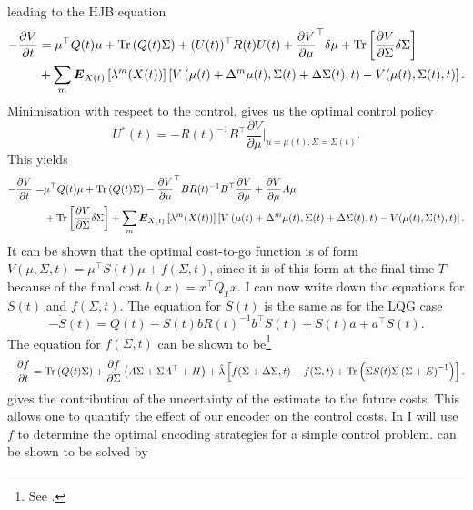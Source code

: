 leading to the HJB equation
\begin{eqnarray}
-\frac{\partial V}{\partial t} &=\mu^\top Q(t)\mu + \operatorname{Tr}\left(Q(t) \Sigma\right) +(U(t))^\top R(t) U(t)  + \frac{\partial V}{\partial \mu}^\top \delta\mu +\operatorname{Tr}\left[\frac{\partial V}{\partial \Sigma} \delta \Sigma\right] \\
&+\sum_m \boldsymbol{E}_{X(t)}\left[\lambda^m(X(t))\right]\left[V\left(\mu(t) +\Delta^m\mu(t) , \Sigma(t)+\Delta\Sigma(t),t\right)-V(\mu(t),\Sigma(t),t)\right]\nonumber.
\end{eqnarray}
Minimisation with respect to the control, gives us the optimal control policy
\[
U^*(t) = -R(t)^{-1} B^\top \frac{\partial V}{\partial \mu}\bigg|_{\mu=\mu(t),\Sigma=\Sigma(t)}.
\]
This yields
\begin{eqnarray}
-\frac{\partial V}{\partial t} =&\mu^\top Q(t)\mu + \operatorname{Tr}\left(Q(t) \Sigma\right) - \frac{\partial V}{\partial \mu}^\top B R(t)^{-1} B^\top \frac{\partial V}{\partial \mu}  + \frac{\partial V}{\partial \mu} A \mu  \\
&+\operatorname{Tr}\left[\frac{\partial V}{\partial \Sigma} \delta \Sigma\right]+\sum_m \boldsymbol{E}_{X(t)}\left[\lambda^m(X(t))\right] \left[V\left(\mu(t) +\Delta^m\mu(t) , \Sigma(t)+\Delta\Sigma(t),t\right)-V(\mu(t),\Sigma(t),t)\right]\nonumber.
\end{eqnarray}
It can be shown that the optimal cost-to-go function is of form $V(\mu,\Sigma,t) = \mu^\top S(t) \mu + f(\Sigma,t)$, since it is of this form at the final time $T$ because 
of the final cost $h(x) = x^\top Q_T x$. I can now write down the equations for $S(t)$ and $f(\Sigma,t)$. The equation for $S(t)$ is the same as for 
the LQG case
\begin{equation}
\label{eq:riccatti}
-\dot{S}(t) = Q(t) - S(t) b R(t)^{-1} b^\top S(t) + S(t) a + a^\top S(t).
\end{equation}
The equation for $f(\Sigma,t)$ can be shown to be\footnote{See .}
\begin{equation}
-\frac{\partial f}{\partial t} = \Tr\left(Q(t) \Sigma\right) + \frac{\partial f}{\partial \Sigma} \left(A\Sigma + \Sigma A^\top + H\right) + \hat{\lambda} \left[f(\Sigma+\Delta\Sigma,t) - f(\Sigma,t) + \Tr\left(\Sigma S(t) \Sigma \left(\Sigma+\covar\right)^{-1}\right)\right].
\label{eq:f_variance}
\end{equation}
 gives the contribution of the uncertainty of the estimate to the future costs. This allows one to quantify the effect of our encoder on the control costs. In
 I will use $f$ to determine the optimal encoding strategies for a simple control problem.  can be shown to be solved by
